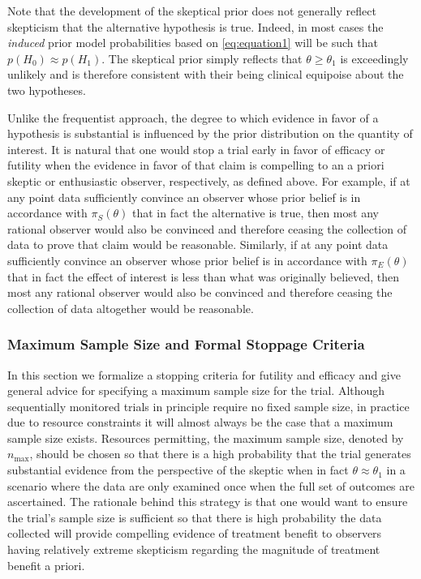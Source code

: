 \documentclass[useAMS,usenatbib,referee]{biom}
\begin{document}
Note that the development of the skeptical prior does not generally reflect skepticism that the alternative hypothesis is true. 
%
Indeed, in most cases the \textit{induced} prior model probabilities based on \eqref{eq:equation1} will be such that $p(H_0) \approx p(H_1)$.
%
The skeptical prior simply reflects that $\theta \ge \theta_1$ is exceedingly unlikely and is therefore 
consistent with their being clinical equipoise about the two hypotheses.
%

Unlike the frequentist approach, the degree to which evidence in favor of a hypothesis is substantial is influenced by 
the prior distribution on the quantity of interest.
%
It is natural that one would stop a trial early in favor of efficacy or futility when the evidence in favor of that claim is compelling
to an a priori skeptic or enthusiastic observer, respectively, as defined above.
%
For example, if at any point data sufficiently convince an observer whose prior belief is in accordance with $\pi_{S}(\theta)$ that in fact
the alternative is true, then most any rational observer would also be convinced and therefore ceasing the collection of data
to prove that claim would be reasonable.
%
Similarly, if at any point data sufficiently convince an observer whose prior belief is in accordance with $\pi_{E}(\theta)$ that in fact
the effect of interest is less than what was originally believed, then most any rational observer would also be convinced and therefore ceasing 
the collection of data altogether would be reasonable.

\subsubsection{Maximum Sample Size and Formal Stoppage Criteria}
In this section we formalize a stopping criteria for futility and efficacy and give general 
advice for specifying a maximum sample size for the trial.
%
Although sequentially monitored trials in principle require no fixed sample size, in practice due to resource 
constraints it will almost always be the case that a maximum sample size exists. 
%
Resources permitting, the maximum sample size, denoted by $n_{\text{max}}$, should be chosen so that there is a 
high probability that the trial generates substantial evidence from the perspective of the skeptic when in 
fact $\theta \approx \theta_1$ in a scenario where the data are only examined once when the full set of 
outcomes are ascertained.
%
The rationale behind this strategy is that one would want to ensure the trial's sample size is sufficient so that
there is high probability the data collected will provide compelling evidence of treatment benefit to observers 
having relatively extreme skepticism regarding the magnitude of treatment benefit a priori.  
\end{document}
